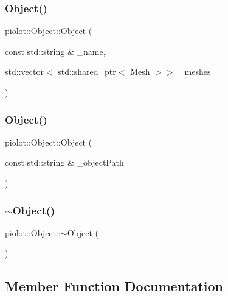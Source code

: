 \subsubsection{\texorpdfstring{Object()}{Object()}\hspace{0.1cm}{\footnotesize\ttfamily [1/2]}}
{\footnotesize\ttfamily piolot\+::\+Object\+::\+Object (\begin{DoxyParamCaption}\item[{const std\+::string \&}]{\+\_\+name,  }\item[{std\+::vector$<$ std\+::shared\+\_\+ptr$<$ \mbox{\hyperlink{classpiolot_1_1_mesh}{Mesh}} $>$$>$}]{\+\_\+meshes }\end{DoxyParamCaption})}

\mbox{\label{classpiolot_1_1_object_add3cd7bb280395a43069e872b384ac97}} 
\subsubsection{\texorpdfstring{Object()}{Object()}\hspace{0.1cm}{\footnotesize\ttfamily [2/2]}}
{\footnotesize\ttfamily piolot\+::\+Object\+::\+Object (\begin{DoxyParamCaption}\item[{const std\+::string \&}]{\+\_\+object\+Path }\end{DoxyParamCaption})\hspace{0.3cm}{\ttfamily [explicit]}}

\mbox{\label{classpiolot_1_1_object_ad6983e37a5ffc74726c4605454643f23}} 
\subsubsection{\texorpdfstring{$\sim$\+Object()}{~Object()}}
{\footnotesize\ttfamily piolot\+::\+Object\+::$\sim$\+Object (\begin{DoxyParamCaption}{ }\end{DoxyParamCaption})\hspace{0.3cm}{\ttfamily [default]}}



\subsection{Member Function Documentation}
\mbox{\label{classpiolot_1_1_object_af3eda47bd353a782ed6fa85fd44bf0ec}} 
